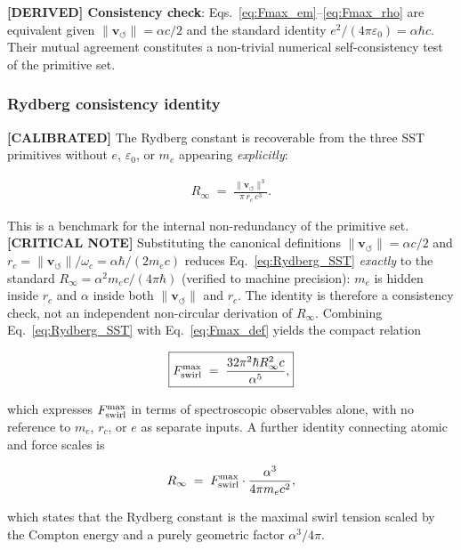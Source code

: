 \documentclass[11pt]{article}
\theoremstyle{definition}
\theoremstyle{plain}
\theoremstyle{remark}
\newcommand{\rc}{{r_c}}
\newcommand{\vnorm}{\lVert \mathbf{v}_{\!\boldsymbol{\circlearrowleft}} \rVert}
\begin{document}
        \textbf{[DERIVED] Consistency check}: Eqs.~\eqref{eq:Fmax_em}--\eqref{eq:Fmax_rho} are equivalent given $\vnorm = \alpha c/2$ and the standard identity $e^2/(4\pi\varepsilon_0) = \alpha\hbar c$. Their mutual agreement constitutes a non-trivial numerical self-consistency test of the primitive set.

        \subsubsection{Rydberg consistency identity}

        \textbf{[CALIBRATED]} The Rydberg constant is recoverable from the three SST primitives without $e$, $\varepsilon_0$, or $m_e$ appearing \emph{explicitly}:

        \begin{align}
            R_\infty \;=\; \frac{\vnorm^3}{\pi\,\rc\,c^3}.
            \label{eq:Rydberg_SST}
        \end{align}

        This is a benchmark for the internal non-redundancy of the primitive set. \textbf{[CRITICAL NOTE]} Substituting the canonical definitions $\vnorm=\alpha c/2$ and $\rc=\vnorm/\omega_c=\alpha\hbar/(2m_ec)$ reduces Eq.~\eqref{eq:Rydberg_SST} \emph{exactly} to the standard $R_\infty=\alpha^2 m_e c/(4\pi\hbar)$ (verified to machine precision): $m_e$ is hidden inside $\rc$ and $\alpha$ inside both $\vnorm$ and $\rc$. The identity is therefore a consistency check, not an independent non-circular derivation of $R_\infty$. Combining Eq.~\eqref{eq:Rydberg_SST} with Eq.~\eqref{eq:Fmax_def} yields the compact relation

        \begin{align}
            \boxed{
            F_{\rm swirl}^{\max}
            \;=\; \frac{32\pi^2\hbar R_\infty^2 c}{\alpha^5},
            }
            \label{eq:Fmax_Rydberg}
        \end{align}

        which expresses $F_{\rm swirl}^{\max}$ in terms of spectroscopic observables alone, with no reference to $m_e$, $\rc$, or $e$ as separate inputs. A further identity connecting atomic and force scales is

        \begin{align}
            R_\infty \;=\; F_{\rm swirl}^{\max} \cdot \frac{\alpha^3}{4\pi m_e c^2},
            \label{eq:Rydberg_Fmax}
        \end{align}

        which states that the Rydberg constant is the maximal swirl tension scaled by the Compton energy and a purely geometric factor $\alpha^3/4\pi$.
\end{document}
